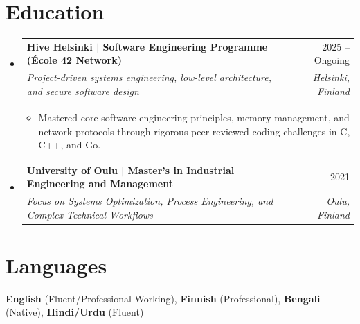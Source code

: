 \documentclass[a4paper,11pt]{article}
\makeatletter
\newcommand{\resumeItem}[1]{
  \item\small{{#1}}
}
\newcommand{\resumeSubheading}[4]{
  \vspace{-1pt}\item
    \begin{tabular*}{0.97\textwidth}[t]{l@{\extracolsep{\fill}}r}
      \textbf{#1} & \small #2 \\
      \textit{\small#3} & \textit{\small #4} \\
    \end{tabular*}\vspace{-6pt}
}
\newcommand{\resumeSubHeadingListStart}{\begin{itemize}[leftmargin=0.15in, label={}]}
\newcommand{\resumeSubHeadingListEnd}{\end{itemize}\vspace{-6pt}}
\newcommand{\resumeItemListStart}{
  \begin{itemize}[leftmargin=0.2in, itemsep=0pt, parsep=0pt, topsep=1pt]
}
\newcommand{\resumeItemListEnd}{\end{itemize}\vspace{-2pt}}
\makeatother
\begin{document}
\vspace{-4pt}

\section{Education}
\resumeSubHeadingListStart
  \resumeSubheading
    {Hive Helsinki $|$ \normalfont Software Engineering Programme (École 42 Network)}{2025 -- Ongoing}
    {Project-driven systems engineering, low-level architecture, and secure software design}{Helsinki, Finland}
    \resumeItemListStart
        \resumeItem{Mastered core software engineering principles, memory management, and network protocols through rigorous peer-reviewed coding challenges in C, C++, and Go.}
    \resumeItemListEnd

  \resumeSubheading
    {University of Oulu $|$ \normalfont Master's in Industrial Engineering and Management}{2021}
    {Focus on Systems Optimization, Process Engineering, and Complex Technical Workflows}{Oulu, Finland}
\resumeSubHeadingListEnd

\vspace{-2pt}

\section{Languages}
\begin{itemize}[leftmargin=0.15in, label={}, itemsep=0pt, topsep=1pt]
\small{\item{
\textbf{English} (Fluent/Professional Working), \textbf{Finnish} (Professional), \textbf{Bengali} (Native), \textbf{Hindi/Urdu} (Fluent)
}}
\end{itemize}
\end{document}

